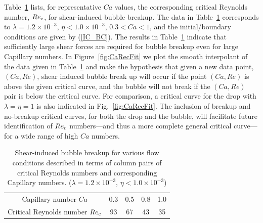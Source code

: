 \documentclass[%
 reprint,
 showkeys,
 amsmath,amssymb,
 aps,
 prfluids,
 onecolumn
]{revtex4-2}
\begin{document}
Table~\ref{tab:CaRecComparison} lists, for representative $Ca$ values, the
corresponding critical Reynolds number, $Re_{\rm c}$, for shear-induced bubble
breakup.  The data in Table~\ref{tab:CaRecComparison} corresponds to $\lambda =
1.2 \times 10^{-3}$, $\eta < 1.0 \times 10^{-3}$, $0.3<Ca<1$, and the
initial/boundary conditions are given by (\ref{IC_BC}).  The results in
Table~\ref{tab:CaRecComparison} indicate that sufficiently large shear forces
are required for bubble breakup even for large Capillary numbers.  In
Figure~\ref{fig:CaRecFit} we plot the smooth interpolant of the data given in
Table~\ref{tab:CaRecComparison} and make the hypothesis that given a new data
point, $(Ca,Re)$,  shear induced bubble break up will occur if the point
$(Ca,Re)$ is above the given critical curve, and the bubble will not break if
the $(Ca,Re)$ pair is below the critical curve.  {\color {red} For comparison,
a critical curve for the drop with $\lambda =\eta = 1$ is also indicated in
Fig.~\ref{fig:CaRecFit}.  The inclusion of breakup and no-breakup critical
curves, for both the drop and the bubble, will facilitate future identification
of $Re_{\rm c}$ numbers---and thus a more complete general critical curve---for
a wide range of high $Ca$ numbers.  }

\begin{table}[tbh]
\caption{Shear-induced bubble breakup for various flow 
	conditions described in terms
        of column pairs of critical Reynolds numbers and 
	corresponding Capillary numbers.
        ($\lambda = 1.2 \times 10^{-3}$, $\eta < 1.0 \times 10^{-3}$) 
	}
\label{tab:CaRecComparison}
\footnotesize
\center
\begin{tabular}{ c  c  c  c  c }
\hline
\hline
Capillary number $Ca$            & 0.3  & 0.5  & 0.8  & 1.0  \\
Critical Reynolds number $Re_{\rm c}$  & 93   & 67   & 43   & 35   \\
\hline
\hline
\end{tabular}
\end{table}
\end{document}
